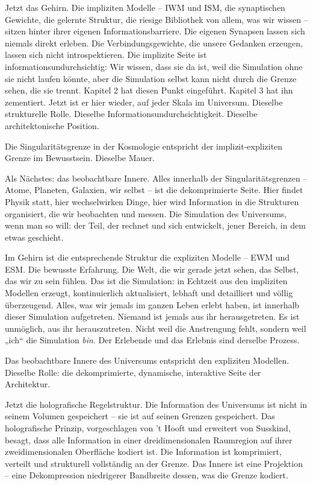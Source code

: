 \documentclass[11pt, twoside, openright]{book}
\begin{document}
Jetzt das Gehirn. Die impliziten Modelle -- IWM und ISM, die synaptischen Gewichte, die gelernte Struktur, die riesige Bibliothek von allem, was wir wissen -- sitzen hinter ihrer eigenen Informationsbarriere. Die eigenen Synapsen lassen sich niemals direkt erleben. Die Verbindungsgewichte, die unsere Gedanken erzeugen, lassen sich nicht introspektieren. Die implizite Seite ist informationsundurchsichtig: Wir wissen, dass sie da ist, weil die Simulation ohne sie nicht laufen könnte, aber die Simulation selbst kann nicht durch die Grenze sehen, die sie trennt. Kapitel 2 hat diesen Punkt eingeführt. Kapitel 3 hat ihn zementiert. Jetzt ist er hier wieder, auf jeder Skala im Universum. Dieselbe strukturelle Rolle. Dieselbe Informationsundurchsichtigkeit. Dieselbe architektonische Position.

Die Singularitätsgrenze in der Kosmologie entspricht der implizit-expliziten Grenze im Bewusstsein. Dieselbe Mauer.

Als Nächstes: das beobachtbare Innere. Alles innerhalb der Singularitätsgrenzen -- Atome, Planeten, Galaxien, wir selbst -- ist die dekomprimierte Seite. Hier findet Physik statt, hier wechselwirken Dinge, hier wird Information in die Strukturen organisiert, die wir beobachten und messen. Die Simulation des Universums, wenn man so will: der Teil, der rechnet und sich entwickelt, jener Bereich, in dem etwas geschieht.

Im Gehirn ist die entsprechende Struktur die expliziten Modelle -- EWM und ESM. Die bewusste Erfahrung. Die Welt, die wir gerade jetzt sehen, das Selbst, das wir zu sein fühlen. Das ist die Simulation: in Echtzeit aus den impliziten Modellen erzeugt, kontinuierlich aktualisiert, lebhaft und detailliert und völlig überzeugend. Alles, was wir jemals im ganzen Leben erlebt haben, ist innerhalb dieser Simulation aufgetreten. Niemand ist jemals aus ihr herausgetreten. Es ist unmöglich, aus ihr herauszutreten. Nicht weil die Anstrengung fehlt, sondern weil „ich“ die Simulation \textit{bin}. Der Erlebende und das Erlebnis sind derselbe Prozess.

Das beobachtbare Innere des Universums entspricht den expliziten Modellen. Dieselbe Rolle: die dekomprimierte, dynamische, interaktive Seite der Architektur.

Jetzt die holografische Regelstruktur. Die Information des Universums ist nicht in seinem Volumen gespeichert -- sie ist auf seinen Grenzen gespeichert. Das holografische Prinzip, vorgeschlagen von 't Hooft und erweitert von Susskind, besagt, dass alle Information in einer dreidimensionalen Raumregion auf ihrer zweidimensionalen Oberfläche kodiert ist. Die Information ist komprimiert, verteilt und strukturell vollständig an der Grenze. Das Innere ist eine Projektion -- eine Dekompression niedrigerer Bandbreite dessen, was die Grenze kodiert.
\end{document}
